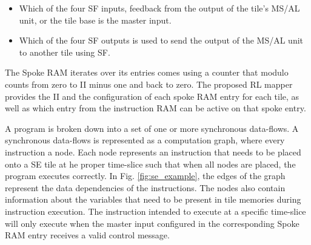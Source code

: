 \begin{itemize}
  \item Which of the four SF inputs, feedback from the output of the tile's MS/AL unit, or the tile base is the master input.
  \item Which of the four SF outputs is used to send the output of the MS/AL unit to another tile using SF.
\end{itemize}

The Spoke RAM iterates over its entries comes using a counter that modulo counts from zero to II minus one and back to zero.
The proposed RL mapper provides the II and the configuration of each spoke RAM entry for each tile, as well as which entry from the instruction RAM can be active on that spoke entry.


A program is broken down into a set of one or more synchronous data-flows.
A synchronous data-flows is represented as a computation graph, where every instruction a node.
Each node represents an instruction that needs to be placed onto a SE tile at he proper time-slice such that when all nodes are placed, the program executes correctly. 
In Fig. \ref{fig:se_example}, the edges of the graph represent the data dependencies of the instructions. 
The nodes also contain information about the variables that need to be present in tile memories during instruction execution. 
The instruction intended to execute at a specific time-slice will only execute when the master input configured in the corresponding Spoke RAM entry receives a valid control message.

